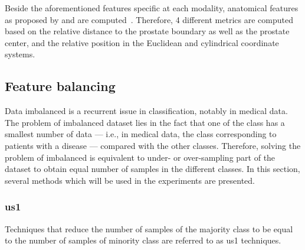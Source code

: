 Beside the aforementioned features specific at each modality, anatomical features as proposed by \citeauthor{Chen2002} and \citeauthor{Litjens2014} are computed~\cite{Chen2002,Litjens2014}.
Therefore, 4 different metrics are computed based on the relative distance to the prostate boundary as well as the prostate center, and the relative position in the Euclidean and cylindrical coordinate systems.

\subsection{Feature balancing}\label{subsec:chp6:method:fea-bal}
Data imbalanced is a recurrent issue in classification, notably in medical data.
The problem of imbalanced dataset lies in the fact that one of the class has a smallest number of data --- i.e., in medical data, the class corresponding to patients with a disease --- compared with the other classes.
Therefore, solving the problem of imbalanced is equivalent to under- or over-sampling part of the dataset to obtain equal number of samples in the different classes.
In this section, several methods which will be used in the experiments are presented.

\subsubsection{\Acl*{us1}}
Techniques that reduce the number of samples of the majority class to be equal to the number of samples of minority class are referred to as \ac{us1} techniques.


